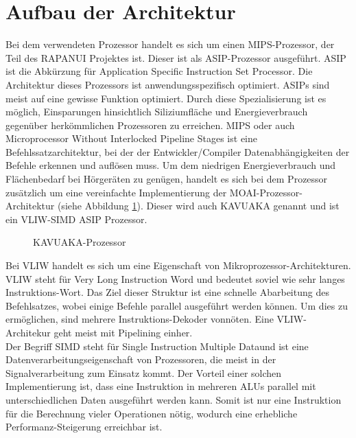 \section{Aufbau der Architektur}
\label{chap:architecture_overview}
Bei dem verwendeten Prozessor handelt es sich um einen MIPS-Prozessor, der Teil des RAPANUI Projektes ist. Dieser ist als ASIP-Prozessor ausgeführt. ASIP ist die Abkürzung für \glqq Application Specific Instruction Set Processor\grqq. Die Architektur dieses Prozessors ist anwendungsspezifisch optimiert. ASIPs sind meist auf eine gewisse Funktion optimiert. Durch diese Spezialisierung ist es möglich, Einsparungen hinsichtlich Siliziumfläche und Energieverbrauch gegenüber herkömmlichen Prozessoren zu erreichen. MIPS oder auch \glqq Microprocessor Without Interlocked Pipeline Stages\grqq{} ist eine Befehlssatzarchitektur, bei der der Entwickler/Compiler Datenabhängigkeiten der Befehle erkennen und auflösen muss.
Um dem niedrigen Energieverbrauch und Flächenbedarf bei Hörgeräten zu genügen, handelt es sich bei dem Prozessor zusätzlich um eine vereinfachte Implementierung der MOAI-Prozessor-Architektur (siehe Abbildung \ref{fig:KAVUAKA}). Dieser wird auch KAVUAKA genannt und ist ein VLIW-SIMD ASIP Prozessor. \cite{hartig2014customizing}\\
	\begin{figure}[H] 
		\centering
		
		\caption[KAVUAKA-Prozessor]{KAVUAKA-Prozessor \cite{lukasglitches2017}}
		\label{fig:KAVUAKA}
	\end{figure}
Bei VLIW  handelt es sich um eine Eigenschaft von Mikroprozessor-Architekturen. VLIW steht für \glqq Very Long Instruction Word \grqq und bedeutet soviel wie sehr langes Instruktions-Wort. Das Ziel dieser Struktur ist eine schnelle Abarbeitung des Befehlsatzes, wobei einige Befehle parallel ausgeführt werden können. Um dies zu ermöglichen, sind mehrere Instruktions-Dekoder vonnöten. Eine VLIW-Architekur geht meist mit Pipelining einher.\\
Der Begriff SIMD steht für \glqq Single Instruction Multiple Data\grqq und ist eine Datenverarbeitungseigenschaft von Prozessoren, die meist in der Signalverarbeitung zum Einsatz kommt. Der Vorteil einer solchen Implementierung ist, dass eine Instruktion in mehreren ALUs parallel mit unterschiedlichen Daten ausgeführt werden kann. Somit ist nur eine Instruktion für die Berechnung vieler Operationen nötig, wodurch eine erhebliche Performanz-Steigerung erreichbar ist.\cite[Seite 249]{wust2010mikroprozessortechnik}\\
